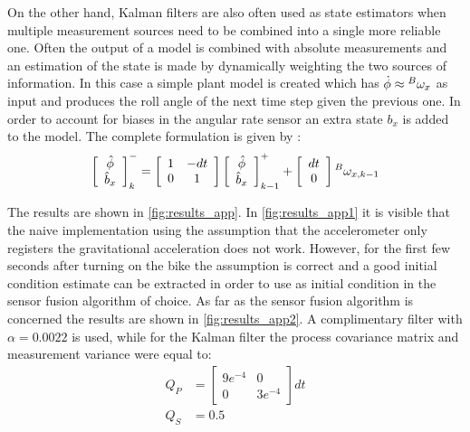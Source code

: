 On the other hand, Kalman filters are also often used as state estimators when multiple measurement sources need to be combined into a single more reliable one. Often the output of a model is combined with absolute measurements and an estimation of the state is made by dynamically weighting the two sources of information. In this case a simple plant model is created which has \ensuremath{\dot{\phi}\approx \prescript{B}{}{\omega_{x}}} as input and  produces the roll angle of the next time step given the previous one. In order to account for biases in the angular rate sensor an extra state \ensuremath{b_x} is added to the model. The complete formulation is given by :
\begin{equation}
\left[ \begin{array}{c}{\hat{\phi}} \\ {\hat{b}_{x}}\end{array}\right]_{k}^{-}=\left[ \begin{array}{cc}{1} & {-d t} \\ {0} & {1}\end{array}\right] \left[ \begin{array}{c}{\hat{\phi}} \\ {\hat{b}_{x}}\end{array}\right]_{k-1}^{+}+\left[ \begin{array}{c}{d t} \\ {0}\end{array}\right] \prescript{B}{}{\omega_{x,k-1}}
\end{equation}


The results are shown in \cref{fig:results_app}. In \cref{fig:results_app1} it is visible that the naive implementation using the assumption that the accelerometer only registers the gravitational acceleration does not work. However, for the first few seconds after turning on the bike the assumption is correct and a good initial condition estimate can be extracted  in order to use as initial condition in the sensor fusion algorithm of choice. As far as the sensor fusion algorithm is concerned the results are shown in \cref{fig:results_app2}. A complimentary filter with \ensuremath{\alpha = 0.0022} is used, while for the Kalman filter the process covariance matrix and measurement variance were equal to:
\begin{align}
Q_P &=\left[\begin{array}{cc}{9 e^{-4}} & {0} \\ {0} & {3 e^{-4}}\end{array}\right]dt 
\\ 
Q_S &=0.5
\end{align}

